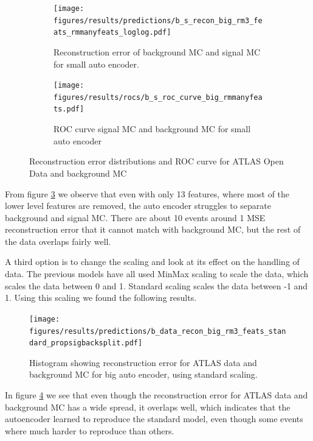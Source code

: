 \documentclass[ reprint, amsmath,amssymb, aps, nofootinbib]{revtex4-2}
\begin{document}
\begin{figure}[h]
     \centering
     \begin{subfigure}[b]{0.46\textwidth}
        \centering
    \texttt{[image: figures/results/predictions/b\_s\_recon\_big\_rm3\_feats\_rmmanyfeats\_loglog.pdf]}
    \caption{Reconstruction error of background MC and signal MC for small auto encoder. }
    \label{fig:s_b_big_pred_13}
     \end{subfigure}
     \hfill
     \begin{subfigure}[b]{0.46\textwidth}
         \centering
         \texttt{[image: figures/results/rocs/b\_s\_roc\_curve\_big\_rmmanyfeats.pdf]}
         \caption{ROC curve signal MC and background MC for small auto encoder}
         \label{fig:s_b_big_roc_13}
     \end{subfigure}
     
        \caption{Reconstruction error distributions and ROC curve for ATLAS Open Data and background MC}
        \label{fig:roc_sig_big_13feats}
\end{figure}

From figure \ref{fig:roc_sig_big_13feats} we observe that even with only 13 features, where most of the lower level features are removed, the auto encoder struggles to separate background and signal MC. There are about 10 events around 1 MSE reconstruction error that it cannot match with background MC, but the rest of the data overlaps fairly well. \par

A third option is to change the scaling and look at its effect on the handling of data. The previous models have all used MinMax scaling to scale the data, which scales the data between 0 and 1. Standard scaling scales the data between -1 and 1. Using this scaling we found the following results.

\begin{figure}[h]
     \centering
         \texttt{[image: figures/results/predictions/b\_data\_recon\_big\_rm3\_feats\_standard\_propsigbacksplit.pdf]}
         \caption{Histogram showing reconstruction error for ATLAS data and background MC for big auto encoder, using standard scaling.}
     \label{fig:data_b_big_pred_stand}
\end{figure}

In figure \ref{fig:data_b_big_pred_stand} we see that even though the reconstruction error for ATLAS data and background MC has a wide spread, it overlaps well, which indicates that the autoencoder learned to reproduce the standard model, even though some events where much harder to reproduce than others. 
\end{document}
